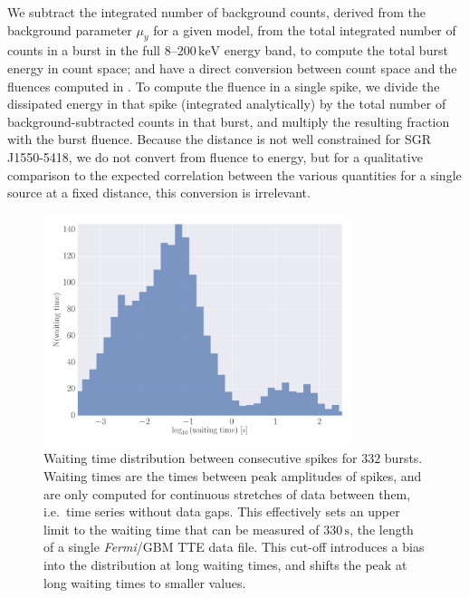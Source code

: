 \documentclass[12pt]{emulateapj}
\newcommand{\project}[1]{\textsl{#1}}
\newcommand{\fermi}{\project{Fermi}}
\newcommand{\counts}{y}
\begin{document}
 We subtract the integrated number of 
 background counts, derived from the background parameter $\mu_\counts$ for a given model, from the total integrated number of 
 counts in a burst in the full $8$--$200\,\mathrm{keV}$ energy band, to compute the total burst energy in count space; and have a direct conversion between count space and 
 the fluences computed in \citet{vanderhorst2012}. To compute the fluence in a single spike, we divide the dissipated energy in that spike (integrated analytically)
 by the total number of background-subtracted counts in that burst, and multiply the resulting fraction with the burst fluence. 
 Because the distance is not well constrained for SGR J1550-5418, we do not convert from fluence to energy, but for a qualitative comparison to the expected correlation between the 
 various quantities for a single source at a fixed distance, this conversion is irrelevant.
  
  \begin{figure}[htbp]
\begin{center}
\includegraphics[width=9cm]{f6.pdf}%
\caption{Waiting time distribution between consecutive spikes for $332$ bursts. Waiting times are the times between peak amplitudes of spikes, and are only computed for
continuous stretches of data between them, i.e.\ time series without data gaps. This effectively sets an upper limit to the waiting time that can be measured of $330\,\mathrm{s}$, the 
length of a single \fermi/GBM TTE data file. This cut-off introduces a bias into the distribution at long waiting times, and shifts the peak at long waiting times to smaller values.}
\label{fig:waitingtimes}
\end{center}
\end{figure}
\end{document}
